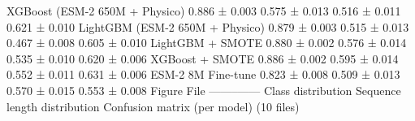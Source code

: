 {}\markdownRendererPipe{} XGBoost (ESM-2 650M + Physico) \markdownRendererPipe{} 0.886 ± 0.003 \markdownRendererPipe{} 0.575 ± 0.013 \markdownRendererPipe{} 0.516 ± 0.011 \markdownRendererPipe{} 0.621 ± 0.010 \markdownRendererPipe{}\markdownRendererSoftLineBreak
{}\markdownRendererPipe{} LightGBM (ESM-2 650M + Physico) \markdownRendererPipe{} 0.879 ± 0.003 \markdownRendererPipe{} 0.515 ± 0.013 \markdownRendererPipe{} 0.467 ± 0.008 \markdownRendererPipe{} 0.605 ± 0.010 \markdownRendererPipe{}\markdownRendererSoftLineBreak
{}\markdownRendererPipe{} LightGBM + SMOTE \markdownRendererPipe{} 0.880 ± 0.002 \markdownRendererPipe{} 0.576 ± 0.014 \markdownRendererPipe{} 0.535 ± 0.010 \markdownRendererPipe{} 0.620 ± 0.006 \markdownRendererPipe{}\markdownRendererSoftLineBreak
{}\markdownRendererPipe{} XGBoost + SMOTE \markdownRendererPipe{} 0.886 ± 0.002 \markdownRendererPipe{} 0.595 ± 0.014 \markdownRendererPipe{} 0.552 ± 0.011 \markdownRendererPipe{} 0.631 ± 0.006 \markdownRendererPipe{}\markdownRendererSoftLineBreak
{}\markdownRendererPipe{} ESM-2 8M Fine-tune \markdownRendererPipe{} 0.823 ± 0.008 \markdownRendererPipe{} 0.509 ± 0.013 \markdownRendererPipe{} 0.570 ± 0.015 \markdownRendererPipe{} 0.553 ± 0.008 \markdownRendererPipe{}\markdownRendererSoftLineBreak
{}\markdownRendererPipe{}  \markdownRendererPipe{}  \markdownRendererPipe{}  \markdownRendererPipe{}  \markdownRendererPipe{}  \markdownRendererPipe{}\markdownRendererInterblockSeparator
{}
\markdownRendererSectionEnd \markdownRendererSectionBegin
{}\markdownRendererInterblockSeparator
{}\markdownRendererPipe{} Figure \markdownRendererPipe{} File \markdownRendererPipe{}\markdownRendererSoftLineBreak
{}\markdownRendererPipe{}--------\markdownRendererPipe{}------\markdownRendererPipe{}\markdownRendererSoftLineBreak
{}\markdownRendererPipe{} Class distribution \markdownRendererPipe{}  \markdownRendererPipe{}\markdownRendererSoftLineBreak
{}\markdownRendererPipe{} Sequence length distribution \markdownRendererPipe{}  \markdownRendererPipe{}\markdownRendererSoftLineBreak
{}\markdownRendererPipe{} Confusion matrix (per model) \markdownRendererPipe{}  (10 files) \markdownRendererPipe{}\markdownRendererSoftLineBreak
